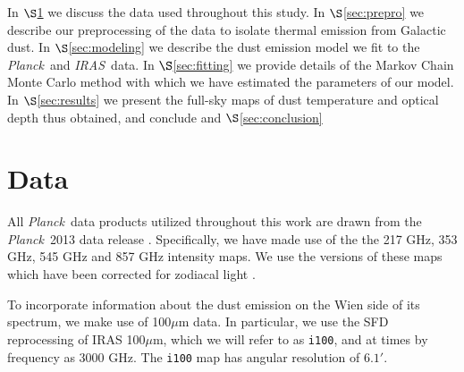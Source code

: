\documentclass{emulateapj}
\newcommand{\IRAS}{{\it IRAS}}
\newcommand{\PLANCK}{{\it Planck}}
\begin{document}

In $\S$\ref{sec:data} we discuss the data used throughout this study. In 
$\S$\ref{sec:prepro} we describe our preprocessing of the data to isolate 
thermal emission from Galactic dust. In $\S$\ref{sec:modeling} we describe the 
dust emission model we fit to the \PLANCK~and \IRAS~data. In 
$\S$\ref{sec:fitting} we provide details of the Markov Chain Monte Carlo method
with which we have estimated the parameters of our model. In 
$\S$\ref{sec:results} we present the full-sky maps of dust temperature and 
optical depth thus obtained, and conclude and $\S$\ref{sec:conclusion}




\section{Data}
\label{sec:data}
All \PLANCK~data products utilized throughout this work are drawn from the 
\PLANCK~2013 data release \citep{planck2013}. Specifically, we have made use 
of the the 217 GHz, 353 GHz, 545 GHz and 857 GHz intensity maps. We use the 
versions of these maps which have been corrected for zodiacal light 
\citep[\texttt{R1.10\_nominal\_ZodiCorrected},][]{planckzodi}.


To incorporate information about the dust emission on the Wien side of its 
spectrum, we make use of 100$\mu$m data. In particular, we use the SFD 
reprocessing of IRAS 100$\mu$m, which we will refer to as \verb|i100|, and at 
times by frequency as 3000 GHz. The \verb|i100| map has angular resolution of 
$6.1'$. 
\end{document}
